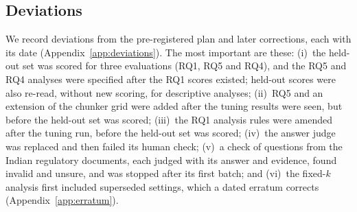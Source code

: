 \subsection{Deviations}
\label{sec:deviations}

We record \DeviationCount{} deviations from the pre-registered plan and \CorrectionCount{} later corrections,
each with its date (Appendix~\ref{app:deviations}). The most important
are these:
(i)~the held-out set was scored for three evaluations (RQ1, RQ5 and RQ4), and the RQ5 and RQ4 analyses were
specified after the RQ1 scores existed; held-out scores were also re-read, without new scoring, for descriptive
analyses;
(ii)~RQ5 and an extension of the chunker grid were added after the
tuning results were seen, but before the held-out set was scored;
(iii)~the RQ1 analysis rules were amended after the tuning run, before
the held-out set was scored;
(iv)~the answer judge was replaced and then failed its human check;
(v)~a check of \GoldenSampled{} questions from the Indian regulatory documents, each judged with its answer and
evidence, found \GoldenInvalid{} invalid and \GoldenUnsure{} unsure, and was stopped after its first batch; and
(vi)~the fixed-$k$ analysis first included superseded settings, which
a dated erratum corrects (Appendix~\ref{app:erratum}).
